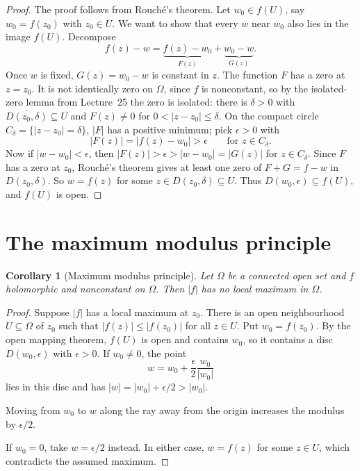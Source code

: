 \documentclass[11pt]{article}
\theoremstyle{plain}
\newtheorem{corollary}[theorem]{Corollary}
\theoremstyle{definition}
\theoremstyle{boldremark}
\theoremstyle{remark}
\numberwithin{equation}{section}
\newenvironment{lecturefigure}
 {\par\addvspace{0.25em}\begingroup\setlength{\parskip}{0pt}\centering}
 {\par\endgroup\addvspace{0.25em}}
\begin{document}
\begin{proof}
The proof follows from Rouch\'e's theorem. Let $w_0\in f(U)$, say
$w_0=f(z_0)$ with $z_0\in U$. We want to show that every $w$ near $w_0$
also lies in the image $f(U)$. Decompose
\[
 f(z)-w=\underbrace{f(z)-w_0}_{F(z)}+\underbrace{w_0-w}_{G(z)}.
\]
Once $w$ is fixed, $G(z)=w_0-w$ is constant in $z$.
The function $F$ has a zero at $z=z_0$. It is not identically zero on
$\Omega$, since $f$ is nonconstant, so by the isolated-zero lemma from Lecture~25 the zero is
isolated: there is $\delta>0$ with $\overline{D(z_0,\delta)}\subseteq U$ and
$F(z)\ne0$ for $0<|z-z_0|\leq\delta$. On the compact circle
$C_\delta=\{|z-z_0|=\delta\}$, $|F|$ has a positive minimum; pick
$\epsilon>0$ with
\[
 |F(z)|=|f(z)-w_0|>\epsilon\qquad\text{for }z\in C_\delta.
\]
Now if $|w-w_0|<\epsilon$, then $|F(z)|>\epsilon>|w-w_0|=|G(z)|$ for
$z\in C_\delta$. Since $F$ has a zero at $z_0$, Rouch\'e's theorem gives at
least one zero of $F+G=f-w$ in $D(z_0,\delta)$. So $w=f(z)$ for
some $z\in D(z_0,\delta)\subseteq U$. Thus $D(w_0,\epsilon)\subseteq f(U)$,
and $f(U)$ is open.
\end{proof}

\section{The maximum modulus principle}
\begin{corollary}[Maximum modulus principle]\label{cor:maximum-modulus}
Let $\Omega$ be a connected open set and $f$ holomorphic and nonconstant
on $\Omega$. Then $|f|$ has no local maximum in $\Omega$.
\end{corollary}
\begin{proof}
Suppose $|f|$ has a local maximum at $z_0$. There is an open neighbourhood
$U\subseteq\Omega$ of $z_0$ such that $|f(z)|\leq|f(z_0)|$ for all $z\in U$.
Put $w_0=f(z_0)$. By the open mapping theorem, $f(U)$ is open and contains
$w_0$, so it contains a disc $D(w_0,\epsilon)$ with $\epsilon>0$.
If $w_0\ne0$, the point
\[
 w=w_0+\frac{\epsilon}{2}\frac{w_0}{|w_0|}
\]
lies in this disc and has $|w|=|w_0|+\epsilon/2>|w_0|$.
\begin{lecturefigure}

{\small Moving from $w_0$ to $w$ along the ray away from the origin
increases the modulus by $\epsilon/2$.}
\end{lecturefigure}
If $w_0=0$, take
$w=\epsilon/2$ instead. In either case, $w=f(z)$ for some $z\in U$, which
contradicts the assumed maximum.
\end{proof}
\end{document}
